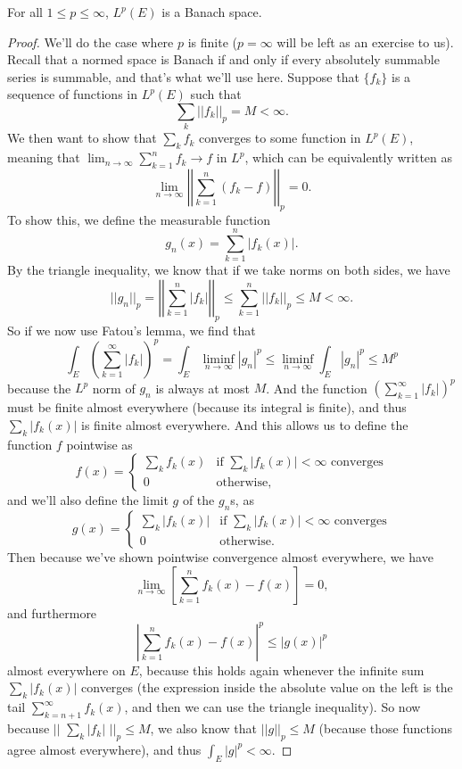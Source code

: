 \begin{theorem}
For all $1 \le p \le \infty$, $L^p(E)$ is a Banach space.
\end{theorem}
\begin{proof}
We'll do the case where $p$ is finite ($p = \infty$ will be left as an exercise to us). Recall that a normed space is Banach if and only if every absolutely summable series is summable, and that's what we'll use here. Suppose that $\{f_k\}$ is a sequence of functions in $L^p(E)$ such that 
\[
    \sum_k ||f_k||_p = M < \infty.
\]
We then want to show that $\sum_k f_k$ converges to some function in $L^p(E)$, meaning that $\lim_{n \to \infty} \sum_{k=1}^n f_k \to f$ in $L^p$, which can be equivalently written as 
\[
    \lim_{n \to \infty} \left|\left|\sum_{k=1}^n (f_k - f)\right|\right|_p = 0.
\]
To show this, we define the measurable function
\[
    g_n(x) = \sum_{k=1}^n |f_k(x)|.
\]
By the triangle inequality, we know that if we take norms on both sides, we have
\[
    ||g_n||_p = \left|\left|\sum_{k=1}^n |f_k|\right|\right|_p \le \sum_{k=1}^n ||f_k||_p \le M < \infty.
\]
So if we now use Fatou's lemma, we find that 
\[
    \int_E \left(\sum_{k=1}^{\infty} |f_k|\right)^p = \int_E \liminf_{n \to \infty} |g_n|^p \le \liminf_{n \to \infty} \int_E |g_n|^p \le M^p
\]
because the $L^p$ norm of $g_n$ is always at most $M$. And the function $\left(\sum_{k=1}^{\infty} |f_k|\right)^p$ must be finite almost everywhere (because its integral is finite), and thus $\sum_k |f_k(x)|$ is finite almost everywhere. And this allows us to define the function $f$ pointwise as
\[
    f(x) = \begin{cases} \sum_k f_k(x) & \text{if }\sum_k|f_k(x)| < \infty \text{ converges} \\ 0 & \text{otherwise,} \end{cases}
\]
and we'll also define the limit $g$ of the $g_n$s, as
\[
    g(x) = \begin{cases} \sum_k |f_k(x)| & \text{if }\sum_k|f_k(x)| < \infty \text{ converges} \\ 0 & \text{otherwise.} \end{cases}
\]
Then because we've shown pointwise convergence almost everywhere, we have
\[
    \lim_{n \to \infty} \left[\sum_{k=1}^n f_k(x) - f(x) \right] = 0,
\]  
and furthermore 
\[
    \left|\sum_{k=1}^n f_k(x) - f(x)\right|^p \le |g(x)|^p
\]
almost everywhere on $E$, because this holds again whenever the infinite sum $\sum_k |f_k(x)|$ converges (the expression inside the absolute value on the left is the tail $\sum_{k=n+1}^{\infty}f_k(x)$, and then we can use the triangle inequality). So now because $||\,\,\sum_k |f_k|\,\, ||_p \le M$, we also know that $||g||_p \le M$ (because those functions agree almost everywhere), and thus $\int_E |g|^p < \infty$. 


\end{proof}
